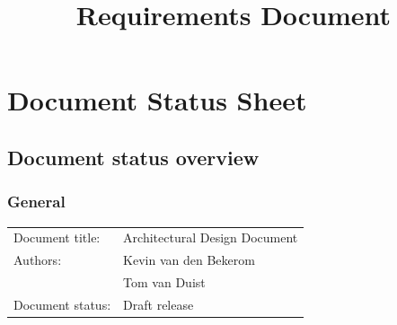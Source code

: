 

\title{Requirements Document}
\newcommand{\TitelAbbr}{RD}
\newcommand{\Version}{0.1}



\supervisors{}





\maketitle


\tableofcontents

\chapter*{Document Status Sheet}
\section*{Document status overview}
\subsection*{General}
\begin{tabular}[!]{ll}
    Document title:     & Architectural Design Document\\
    Authors:           	& Kevin van den Bekerom \\ 
						& Tom van Duist \\
    Document status:    & Draft release\\
\end{tabular}

